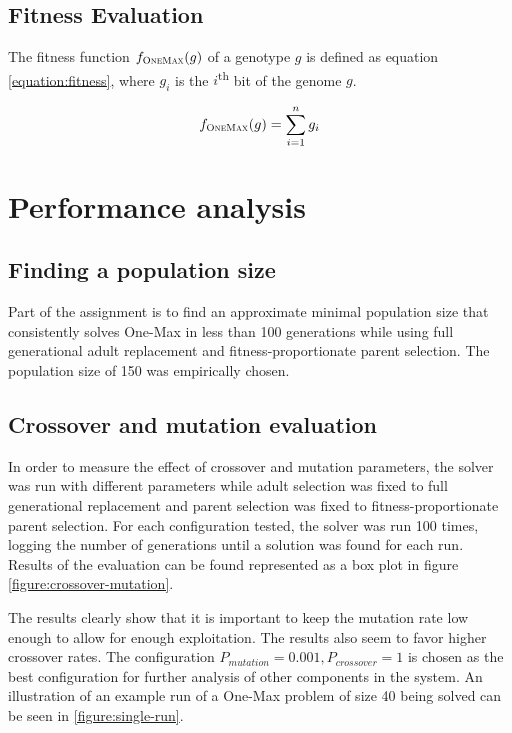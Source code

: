 \documentclass[twocolumn,oneside]{amsart}
\begin{document}
\subsection{Fitness Evaluation}

The fitness function $ f_{\textsc{OneMax}}(g) $ of a genotype $ g $ is defined as equation \ref{equation:fitness}, where $ g_i $ is the $ i $\textsuperscript{th} bit of the genome $ g $.

\begin{equation}\label{equation:fitness}
f_{\textsc{OneMax}}(g) = \sum_{i=1}^{n} g_i
\end{equation}


\section{Performance analysis}

\subsection{Finding a population size}

Part of the assignment is to find an approximate minimal population size that consistently solves One-Max in less than 100 generations while using full generational adult replacement and fitness-proportionate parent selection.
The population size of 150 was empirically chosen.

\subsection{Crossover and mutation evaluation}

In order to measure the effect of crossover and mutation parameters, the solver was run with different parameters while adult selection was fixed to full generational replacement and parent selection was fixed to fitness-proportionate parent selection.
For each configuration tested, the solver was run 100 times, logging the number of generations until a solution was found for each run.
Results of the evaluation can be found represented as a box plot in figure \ref{figure:crossover-mutation}.

The results clearly show that it is important to keep the mutation rate low enough to allow for enough exploitation.
The results also seem to favor higher crossover rates.
The configuration $ P_{mutation} = 0.001, P_{crossover} = 1 $ is chosen as the best configuration for further analysis of other components in the system.
An illustration of an example run of a One-Max problem of size 40 being solved can be seen in \ref{figure:single-run}.
\end{document}
